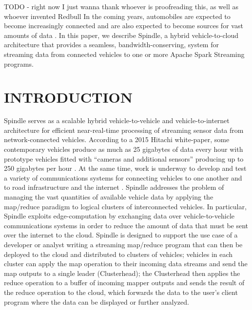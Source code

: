 \documentclass{thesis}
\author{William Rory Kronmiller}
\begin{document}
 
\titlepage             %
\tableofcontents       %
\listoftables          %
\listoffigures         %

   TODO - right now I just wanna thank whoever is proofreading this, as well as whoever invented Redbull 
    In the coming years, automobiles are expected to become increasingly connected and are
    also expected to become sources for vast amounts of data \cite{hitachi}. In this paper,
    we describe Spindle, a hybrid vehicle-to-cloud architecture that provides a seamless,
    bandwidth-conserving, system for streaming data from connected vehicles to one or more
    Apache Spark Streaming programs.

\chapter{INTRODUCTION}
    Spindle serves as a scalable hybrid vehicle-to-vehicle and vehicle-to-internet architecture
    for efficient near-real-time processing of streaming sensor data from network-connected vehicles.
    According to a 2015 Hitachi white-paper, some contemporary vehicles produce as much
    as 25 gigabytes of data every hour with prototype vehicles fitted with ``cameras and additional
    sensors'' producing up to 250 gigabytes per hour \cite{hitachi}. At the same time, work is underway
    to develop and test a variety of communications systems for connecting vehicles to one another
    and to road infrastructure and the internet \cite{connectivitypaper}. Spindle addresses the problem
    of managing the vast quantities of available vehicle data by applying the map/reduce \cite{mapreduce}
    paradigm to logical clusters of interconnected vehicles. In particular, Spindle exploits edge-computation
    by exchanging data over vehicle-to-vehicle communications systems in order to reduce the amount of data
    that must be sent over the internet to the cloud. Spindle is designed to support the use case
    of a developer or analyst writing a streaming map/reduce program that can then be deployed to the cloud
    and distributed to clusters of vehicles; vehicles in each cluster can apply the map operation to their
    incoming data streams and send the map outputs to a single leader (Clusterhead); the Clusterhead then
    applies the reduce operation to a buffer of incoming mapper outputs and sends the result of the reduce
    operation to the cloud, which forwards the data to the user's client program where the data can be
    displayed or further analyzed.
\end{document}
